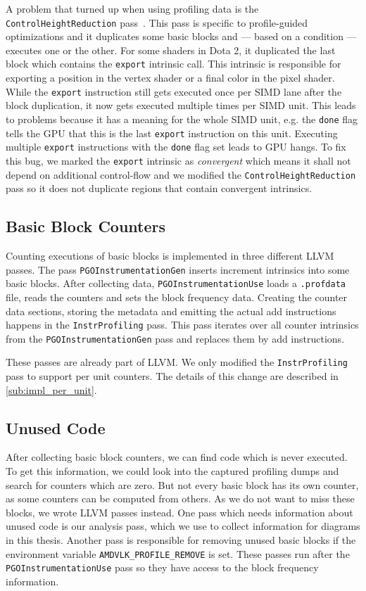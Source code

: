 A problem that turned up when using profiling data is the \texttt{ControlHeightReduction} pass~\cite{ControlHeightReduction}.
This pass is specific to profile-guided optimizations and it duplicates some basic blocks and --- based on a condition --- executes one or the other.
For some shaders in Dota 2, it duplicated the last block which contains the \texttt{export} intrinsic call.
This intrinsic is responsible for exporting a position in the vertex shader or a final color in the pixel shader.
While the \texttt{export} instruction still gets executed once per SIMD lane after the block duplication, it now gets executed multiple times per SIMD unit.
This leads to problems because it has a meaning for the whole SIMD unit, e.g. the \texttt{done} flag tells the GPU that this is the last \texttt{export} instruction on this unit.
Executing multiple \texttt{export} instructions with the \texttt{done} flag set leads to GPU hangs.
To fix this bug, we marked the \texttt{export} intrinsic as \emph{convergent} which means it shall not depend on additional control-flow and we modified the \texttt{ControlHeightReduction} pass so it does not duplicate regions that contain convergent intrinsics.

\subsection{Basic Block Counters}
\label{sub:bbcounters}
Counting executions of basic blocks is implemented in three different LLVM passes.
The pass \texttt{PGOInstrumentationGen} inserts increment intrinsics into some basic blocks.
After collecting data, \texttt{PGOInstrumentationUse} loads a \texttt{.profdata} file, reads the counters and sets the block frequency data.
Creating the counter data sections, storing the metadata and emitting the actual add instructions happens in the \texttt{InstrProfiling} pass.
This pass iterates over all counter intrinsics from the \texttt{PGOInstrumentationGen} pass and replaces them by add instructions.

These passes are already part of LLVM. We only modified the \texttt{InstrProfiling} pass to support per unit counters.
The details of this change are described in \cref{sub:impl_per_unit}.

\subsection{Unused Code}
\label{sub:impl_unused_code}
After collecting basic block counters, we can find code which is never executed.
To get this information, we could look into the captured profiling dumps and search for counters which are zero. But not every basic block has its own counter, as some counters can be computed from others.
As we do not want to miss these blocks, we wrote LLVM passes instead.
One pass which needs information about unused code is our analysis pass, which we use to collect information for diagrams in this thesis.
Another pass is responsible for removing unused basic blocks if the environment variable \texttt{AMDVLK\_PROFILE\_REMOVE} is set.
These passes run after the \texttt{PGOInstrumentationUse} pass so they have access to the block frequency information.

